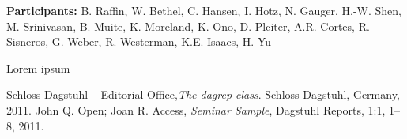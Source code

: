 
\license

\textbf{\sffamily Participants:} B. Raffin, W. Bethel, C. Hansen, I. Hotz, N. Gauger, H.-W. Shen, M. Srinivasan, B. Muite, K. Moreland, K. Ono, D. Pleiter, A.R. Cortes, R. Sisneros, G. Weber, R. Westerman, K.E. Isaacs, H. Yu

\bigskip\noindent
Lorem ipsum

\begin{thebibliography}{0}
 Schloss Dagstuhl -- Editorial Office,\textsl{The dagrep class}. Schloss Dagstuhl, Germany, 2011.
 John Q. Open; Joan R. Access, \textsl{Seminar Sample}, Dagstuhl Reports, 1:1, 1--8, 2011.
\end{thebibliography}


